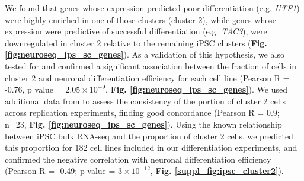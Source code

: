 We found that genes whose expression predicted poor differentiation (e.g. \textit{UTF1}) were highly enriched in one of those clusters (cluster 2), while genes whose expression were predictive of successful differentiation (e.g. \textit{TAC3}), were downregulated in cluster 2 relative to the remaining iPSC clusters (\textbf{Fig. \ref{fig:neuroseq_ips_sc_genes}}). 
As a validation of this hypothesis, we also tested for and confirmed a significant association between the fraction of cells in cluster 2 and neuronal differentiation efficiency for each cell line (Pearson R = -0.76, p value = $2.05 \times 10^{-9}$, \textbf{Fig. \ref{fig:neuroseq_ips_sc_genes}}). 
We used additional data from \cite{cuomo2020single} to assess the consistency of the portion of cluster 2 cells across replication experiments, finding good concordance (Pearson R = 0.9; n=23, \textbf{Fig. \ref{fig:neuroseq_ips_sc_genes}}).
Using the known relationship between iPSC bulk RNA-seq and the proportion of cluster 2 cells, we predicted this proportion for 182 cell lines included in our differentiation experiments, and confirmed the negative correlation with neuronal differentiation efficiency (Pearson R = -0.49; p value = $3 \times 10^{-12}$, \textbf{Fig. \ref{suppl_fig:ipsc_cluster2}}). 
\\

